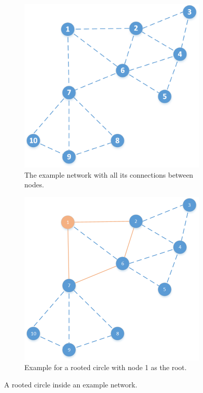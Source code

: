 \begin{figure}[htbp]
	\centering
	\begin{subfigure}[t]{0.4\textwidth}
		\centering
    		\includegraphics[scale=0.5]{content/images/Schedule/Network}
   	 	\caption{The example network with all its connections between nodes.}
    	\label{fig:network}
    \end{subfigure}
    \quad
    \quad
    \begin{subfigure}[t]{0.4\textwidth}
		\centering         
        \includegraphics[scale=0.5]{content/images/Schedule/RootedCircle}
        \caption{Example for a rooted circle with node 1 as the root.}
        \label{fig:rootedCircle}
    \end{subfigure}
    \label{fig:networkRootedCircle}
    \caption{A rooted circle inside an example network.}
\end{figure}

